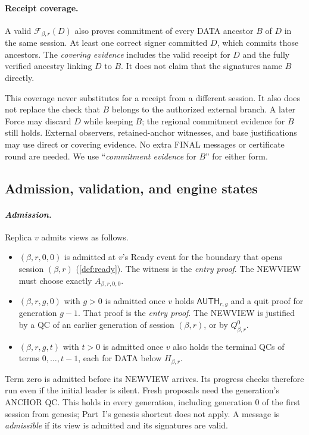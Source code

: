 \documentclass[11pt,a4paper]{article}
\newcommand{\FC}{\mathcal F}
\newcommand{\tagg}[1]{\ensuremath{\mathsf{#1}}}
\newcommand{\defterm}[1]{\textcolor{rrBlue}{\textit{#1}}}
\begin{document}
\paragraph{Receipt coverage.}
\label{sec:coverage}
A valid $\FC_{\beta,r}(D)$ also proves commitment of every DATA ancestor $B$
of $D$ in the same session. At least one correct signer committed
$D$, which commits those ancestors. The \defterm{covering evidence} includes the
valid receipt for $D$ and the fully verified ancestry linking $D$ to $B$.
It does not claim that the signatures name $B$ directly.

This coverage never substitutes for a receipt from a different session.
It also does not replace the check that $B$ belongs to the authorized
external branch. A later Force may discard $D$ while keeping $B$; the
regional commitment evidence for $B$ still holds. External observers,
retained-anchor witnesses, and base justifications may use direct or
covering evidence. No extra FINAL messages or certificate round are
needed. We use ``\defterm{commitment evidence} for $B$'' for either form.

\subsection{Admission, validation, and engine states}
\label{sec:admission}
\paragraph{\defterm{Admission.}}
Replica $v$ admits views as follows.
\begin{itemize}
\item $(\beta,r,0,0)$ is admitted at $v$'s Ready event for the boundary that
opens session $(\beta,r)$ (\cref{def:ready}). The witness is the \defterm{entry proof}.
The NEWVIEW must choose exactly $A_{\beta,r,0,0}$.
\item $(\beta,r,g,0)$ with $g>0$ is admitted once $v$ holds
$\tagg{AUTH}_{r,g}$ and a quit proof for generation $g-1$. That proof is
the \defterm{entry proof}. The NEWVIEW is justified by a QC of an earlier
generation of session $(\beta,r)$, or by $Q_{\beta,r}^0$.
\item $(\beta,r,g,t)$ with $t>0$ is admitted once $v$ also holds the terminal
QCs of terms $0,\ldots,t-1$, each for DATA below $H_{\beta,r}$.
\end{itemize}
Term zero is admitted before its NEWVIEW arrives. Its progress checks
therefore run even if the initial leader is silent. Fresh proposals need
the generation's ANCHOR QC. This holds in every generation, including
generation $0$ of the first session from genesis; Part~I's
genesis shortcut does not apply. A
message is \defterm{admissible} if its view is admitted and its signatures
are valid.
\end{document}
